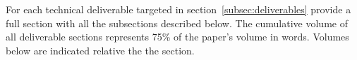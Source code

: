 {\color{gray}
For each technical deliverable targeted in
section~\ref{subsec:deliverables} provide a full section with all the
subsections described below.  The cumulative volume of all deliverable
sections represents 75\% of the paper's volume in words. Volumes below
are indicated relative the the section.
}
